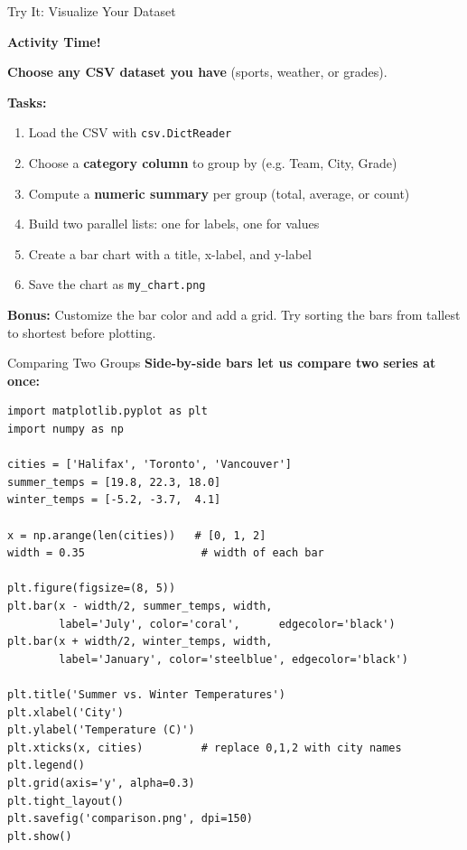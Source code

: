 \documentclass{csbeamer}
\begin{document}
\begin{frame}{Try It: Visualize Your Dataset}
    \begin{center}
        \Large \textbf{Activity Time!}
    \end{center}

    \vspace{1em}

    \textbf{Choose any CSV dataset you have} (sports, weather, or grades).

    \vspace{0.8em}

    \textbf{Tasks:}
    \begin{enumerate}
        \item Load the CSV with \texttt{csv.DictReader}
        \item Choose a \textbf{category column} to group by (e.g. Team, City, Grade)
        \item Compute a \textbf{numeric summary} per group (total, average, or count)
        \item Build two parallel lists: one for labels, one for values
        \item Create a bar chart with a title, x-label, and y-label
        \item Save the chart as \texttt{my\_chart.png}
    \end{enumerate}

    \vspace{0.8em}

    \textbf{Bonus:} Customize the bar color and add a grid. Try sorting the bars from tallest to shortest before plotting.
\end{frame}

\begin{frame}[fragile]{Comparing Two Groups}
    \textbf{Side-by-side bars let us \textcolor{marigold}{compare two series} at once:}

    \begin{lstlisting}
import matplotlib.pyplot as plt
import numpy as np

cities = ['Halifax', 'Toronto', 'Vancouver']
summer_temps = [19.8, 22.3, 18.0]
winter_temps = [-5.2, -3.7,  4.1]

x = np.arange(len(cities))   # [0, 1, 2]
width = 0.35                  # width of each bar

plt.figure(figsize=(8, 5))
plt.bar(x - width/2, summer_temps, width,
        label='July', color='coral',      edgecolor='black')
plt.bar(x + width/2, winter_temps, width,
        label='January', color='steelblue', edgecolor='black')

plt.title('Summer vs. Winter Temperatures')
plt.xlabel('City')
plt.ylabel('Temperature (C)')
plt.xticks(x, cities)         # replace 0,1,2 with city names
plt.legend()
plt.grid(axis='y', alpha=0.3)
plt.tight_layout()
plt.savefig('comparison.png', dpi=150)
plt.show()
    \end{lstlisting}
\end{frame}
\end{document}
